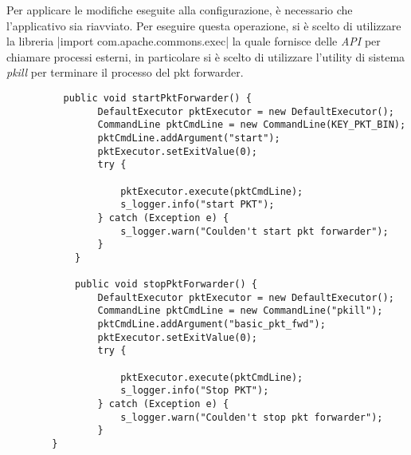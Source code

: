 Per applicare le modifiche eseguite alla configurazione, è necessario che
l'applicativo sia riavviato. Per eseguire questa operazione, si è scelto di
utilizzare la libreria 
|import com.apache.commons.exec|
la quale fornisce delle \emph{API} per chiamare processi esterni, in particolare
si è scelto di utilizzare l'utility di sistema \emph{pkill} per terminare il
processo del pkt forwarder.
\begin{verbatim}
          public void startPktForwarder() {
                DefaultExecutor pktExecutor = new DefaultExecutor();
                CommandLine pktCmdLine = new CommandLine(KEY_PKT_BIN);
                pktCmdLine.addArgument("start");
                pktExecutor.setExitValue(0);
                try {

                    pktExecutor.execute(pktCmdLine);
                    s_logger.info("start PKT");
                } catch (Exception e) {
                    s_logger.warn("Coulden't start pkt forwarder");
                }
            }

            public void stopPktForwarder() {
                DefaultExecutor pktExecutor = new DefaultExecutor();
                CommandLine pktCmdLine = new CommandLine("pkill");
                pktCmdLine.addArgument("basic_pkt_fwd");
                pktExecutor.setExitValue(0);
                try {

                    pktExecutor.execute(pktCmdLine);
                    s_logger.info("Stop PKT");
                } catch (Exception e) {
                    s_logger.warn("Coulden't stop pkt forwarder");
                }
        }

\end{verbatim}




